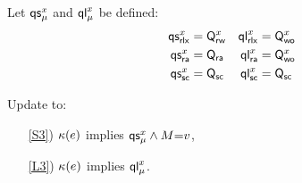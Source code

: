 \begin{definition}
  \label{def:QS}
  Let $\mathsf{qs}_{\mu}^{x}$ and $\mathsf{ql}_{\mu}^{x}$ be defined:
  \begin{align*}
    \mathsf{qs}_{{\mathsf{rlx}}}^{x}&=\mathsf{Q}_{\mathsf{rw}}^{x}
    &\mathsf{ql}_{{\mathsf{rlx}}}^{x}&=\mathsf{Q}_{\mathsf{wo}}^{x}
    \\
    \mathsf{qs}_{{\mathsf{ra}}}^{x}&=\mathsf{Q}_{{\mathsf{ra}}}
    &\mathsf{ql}_{{\mathsf{ra}}}^{x}&=\mathsf{Q}_{\mathsf{wo}}^{x}
    \\
    \mathsf{qs}_{{\mathsf{sc}}}^{x}&=\mathsf{Q}_{{\mathsf{sc}}}
    &\mathsf{ql}_{{\mathsf{sc}}}^{x}&=\mathsf{Q}_{{\mathsf{sc}}}
  \end{align*}
\end{definition}

\begin{definition}[$\xCO$/$\xRASC$]
  \label{def:pomsets-ra}
  Update  to:
  \begin{enumerate}
  \item[\ref{S3})]
    $\kappa(e)$ implies $\mathsf{qs}_{\mu}^{x}\land M{=}v$,
  \item[\ref{L3})]
    $\kappa(e)$ implies $\mathsf{ql}_{\mu}^{x}$.
  \end{enumerate}
\end{definition}








